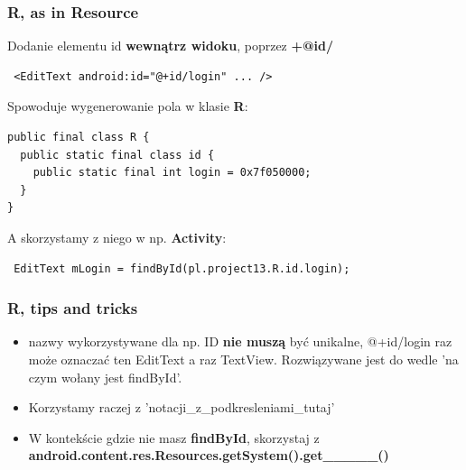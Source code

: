 \documentclass{beamer}
\begin{document}
\begin{frame}[fragile]
 \frametitle{R, as in Resource}  
 Dodanie elementu id \textbf{wewnątrz widoku}, poprzez \textbf{+@id/}
\begin{lstlisting}
 <EditText android:id="@+id/login" ... />
\end{lstlisting}

\pause

Spowoduje wygenerowanie pola w klasie \textbf{R}:
\begin{lstlisting}
public final class R {
  public static final class id {
    public static final int login = 0x7f050000;
  }
}
\end{lstlisting}

\pause

A skorzystamy z niego w np. \textbf{Activity}:
\begin{lstlisting}
 EditText mLogin = findById(pl.project13.R.id.login);
\end{lstlisting}
\end{frame}

\begin{frame}
\frametitle{R, tips and tricks}

\begin{itemize}
 \item nazwy wykorzystywane dla np. ID \textbf{nie muszą} być unikalne, @+id/login raz może oznaczać ten EditText a raz TextView.
       Rozwiązywane jest do wedle 'na czym wołany jest findById'.
 \pause \item Korzystamy raczej z 'notacji\_z\_podkresleniami\_tutaj'
 \pause \item W kontekście gdzie nie masz \textbf{findById}, skorzystaj z \textbf{android.content.res.Resources.getSystem().get\_\_\_\_\_()}
\end{itemize}


\end{frame}
\end{document}
